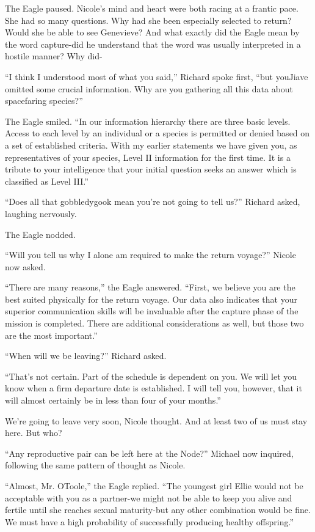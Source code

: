 \documentclass[]{article}
\begin{document}
{The Eagle paused.  Nicole’s mind and heart were both racing at a frantic pace.  She had so many questions.  Why had she been especially selected to return? Would she be able to see Genevieve? And what exactly did the Eagle mean by the word capture-did he understand that the word was usually interpreted in a hostile manner? Why did-

“I think I understood most of what you said,” Richard spoke first, “but youJiave omitted some crucial information.  Why are you gathering all this data about spacefaring species?”

The Eagle smiled.  “In our information hierarchy there are three basic levels.  Access to each level by an individual or a species is permitted or denied based on a set of established criteria.  With my earlier statements we have given you, as representatives of your species, Level II information for the first time.  It is a tribute to your intelligence that your initial question seeks an answer which is classified as Level III.”

“Does all that gobbledygook mean you’re not going to tell us?” Richard asked, laughing nervously.

The Eagle nodded.

“Will you tell us why I alone am required to make the return voyage?” Nicole now asked.

“There are many reasons,” the Eagle answered.  “First, we believe you are the best suited physically for the return voyage.  Our data also indicates that your superior communication skills will be invaluable after the capture phase of the mission is completed.  There are additional considerations as well, but those two are the most important.”

“When will we be leaving?” Richard asked.

“That’s not certain.  Part of the schedule is dependent on you.  We will let you know when a firm departure date is established.  I will tell you, however, that it will almost certainly be in less than four of your months.”

We’re going to leave very soon, Nicole thought.  And at least two of us must stay here.  But who?

“Any reproductive pair can be left here at the Node?” Michael now inquired, following the same pattern of thought as Nicole.

“Almost, Mr.  OToole,” the Eagle replied.  “The youngest girl Ellie would not be acceptable with you as a partner-we might not be able to keep you alive and fertile until she reaches sexual maturity-but any other combination would be fine.  We must have a high probability of successfully producing healthy offspring.”

}
\end{document}

